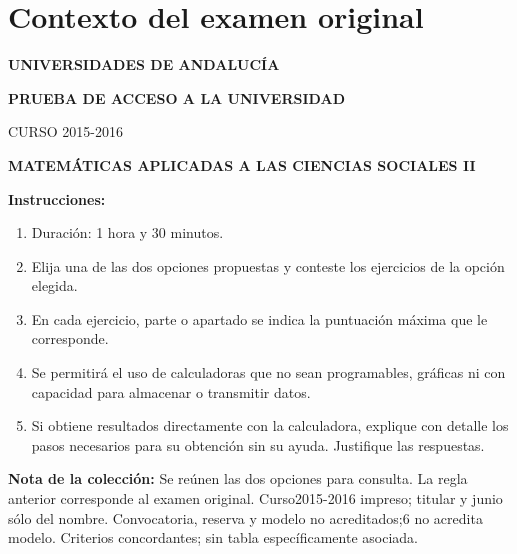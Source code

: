 \section*{Contexto del examen original}
\textbf{UNIVERSIDADES DE ANDALUCÍA}\par
\textbf{PRUEBA DE ACCESO A LA UNIVERSIDAD}\par
CURSO 2015-2016\par
\textbf{MATEMÁTICAS APLICADAS A LAS CIENCIAS SOCIALES II}

\textbf{Instrucciones:}
\begin{enumerate}[label=\textbf{\alph*)}]
  \item Duración: 1 hora y 30 minutos.
  \item Elija una de las dos opciones propuestas y conteste los ejercicios de la opción elegida.
  \item En cada ejercicio, parte o apartado se indica la puntuación máxima que le corresponde.
  \item Se permitirá el uso de calculadoras que no sean programables, gráficas ni con capacidad para almacenar o transmitir datos.
  \item Si obtiene resultados directamente con la calculadora, explique con detalle los pasos necesarios para su obtención sin su ayuda. Justifique las respuestas.
\end{enumerate}
\noindent\textbf{Nota de la colección:} Se reúnen las dos opciones para consulta. La regla anterior corresponde al examen original. Curso2015-2016 impreso; titular y junio sólo del nombre. Convocatoria, reserva y modelo no acreditados;6 no acredita modelo. Criterios concordantes; sin tabla específicamente asociada.
\par\medskip
